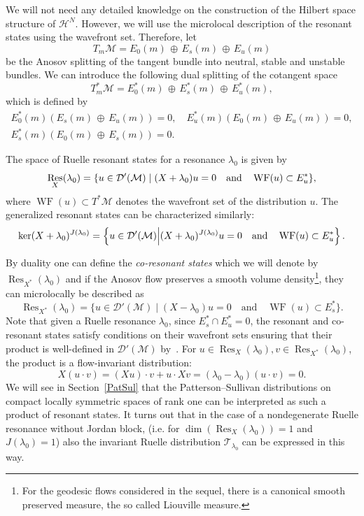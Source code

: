\documentclass[AHL, Unicode, longabstracts, published]{cedram}
\DeclareMathOperator{\WF}{WF}
\DeclareMathOperator{\Res}{Res}
\newcommand{\mc}{\mathcal}
\begin{document}
We will not need any detailed knowledge on the construction of the Hilbert space structure of $\mc{H}^N$. However, we will use the microlocal description of the resonant states using the wavefront set. Therefore, let
\[
T_m \mathcal M = E_0(m)\,\oplus\,E_s(m)\,\oplus\,E_u(m)
\]
be the Anosov splitting of the tangent bundle into neutral, stable and unstable bundles. We can introduce the following dual splitting of the cotangent space
\[
T^*_m\mathcal M = E_0^*(m)\,\oplus\,E_s^*(m)\,\oplus\, E_u^*(m),
\]
which is defined by
\[
\begin{gathered}
E^*_0(m)(E_s(m)\,\oplus\,E_u(m))=0,\quad E^*_u(m)(E_0(m)\,\oplus\,E_u(m))=0,\\
E^*_s(m)(E_0(m)\,\oplus\,E_s(m))=0.
\end{gathered}
\]

\begin{lemm}\label{lem:microlocal_res_state}
The space of Ruelle resonant states for a resonance $\lambda_0$ is given by
\begin{equation}\label{eq:microlocal_res_state}
\Res_{X}(\lambda_0) = \{u\in \mathcal D'(\mathcal M)\mid(X+\lambda_0)u=0\quad
\text{\rm and}\quad\WF(u)\subset E^*_u \},
\end{equation}
where ${\WF}(u)\subset T^*\mc{M}$ denotes the wavefront set of the distribution $u$. The generalized resonant states can be characterized similarly:
\begin{equation}\label{eq:microlocal_gen_res_state}
\ker(X+\lambda_0)^{J(\lambda_0)} = \left\{u\in \mathcal D'(\mathcal M)\middle|(X+\lambda_0)^{J(\lambda_0)}u=0 \quad \text{\rm and}\quad\WF(u)\subset E^*_u \right\}.
\end{equation}
\end{lemm}

\goodbreak
By duality one can define the \emph{co-resonant states} which we will denote by $\Res_{X^*}(\lambda_0)$ and if the Anosov flow preserves a smooth volume density\footnote{For the geodesic flows considered in the sequel, there is a canonical smooth preserved measure, the so called Liouville measure.}, they can microlocally be described as
\begin{equation}\label{eq:microlocal_cores_state}
\Res_{X^*}(\lambda_0) = \{u\in \mathcal D'(\mathcal M)\mid (X- \lambda_0)u=0 \quad\text{and}\quad\WF(u)\subset E^*_s \}.
\end{equation}
Note that given a Ruelle resonance $\lambda_0$, since $E_s^*\cap E_u^*=0$, the resonant and co-resonant states satisfy conditions on their wavefront sets ensuring that their product is well-defined in $\mc{D}'(\mc{M})$ by~\cite[Theorem~8.2.10]{HoeI}. For $u\in \Res_{X}(\lambda_0), v\in \Res_{X^*}(\lambda_0)$, the product is a flow-invariant distribution:
\[
X(u\cdot v) = (X u)\cdot v + u\cdot X v = (\lambda_0-\lambda_0)(u\cdot v)=0.
\]
We will see in Section~\ref{PatSul} that the Patterson--Sullivan distributions on compact locally symmetric spaces of rank one can be interpreted as such a product of resonant states. It turns out that in the case of a nondegenerate Ruelle resonance without Jordan block, (i.e. for $\dim(\Res_{X}(\lambda_0)) = 1$ and $J(\lambda_0)=1$) also the invariant Ruelle distribution $\mathcal T_{\lambda_0}$ can be expressed in this way.
\end{document}
